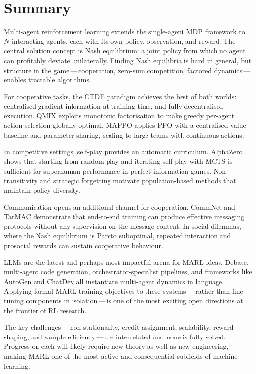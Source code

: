 \section{Summary}
\label{sec:marl-summary}

Multi-agent reinforcement learning extends the single-agent MDP
framework to $N$ interacting agents, each with its own policy,
observation, and reward. The central solution concept is Nash
equilibrium: a joint policy from which no agent can profitably
deviate unilaterally. Finding Nash equilibria is hard in general,
but structure in the game\,---\,cooperation, zero-sum competition,
factored dynamics\,---\,enables tractable algorithms.

For cooperative tasks, the CTDE paradigm achieves the best of
both worlds: centralised gradient information at training time,
and fully decentralised execution. QMIX exploits monotonic
factorisation to make greedy per-agent action selection globally
optimal. MAPPO applies PPO with a centralised value baseline and
parameter sharing, scaling to large teams with continuous actions.

In competitive settings, self-play provides an automatic curriculum.
AlphaZero shows that starting from random play and iterating
self-play with MCTS is sufficient for superhuman performance in
perfect-information games. Non-transitivity and strategic forgetting
motivate population-based methods that maintain policy diversity.

Communication opens an additional channel for cooperation.
CommNet and TarMAC demonstrate that end-to-end training can
produce effective messaging protocols without any supervision
on the message content. In social dilemmas, where the Nash
equilibrium is Pareto suboptimal, repeated interaction and
prosocial rewards can sustain cooperative behaviour.

LLMs are the latest and perhaps most impactful arena for MARL
ideas. Debate, multi-agent code generation, orchestrator-specialist
pipelines, and frameworks like AutoGen and ChatDev all instantiate
multi-agent dynamics in language. Applying formal MARL training
objectives to these systems\,---\,rather than fine-tuning components
in isolation\,---\,is one of the most exciting open directions at
the frontier of RL research.

The key challenges\,---\,non-stationarity, credit assignment,
scalability, reward shaping, and sample efficiency\,---\,are
interrelated and none is fully solved. Progress on each will likely
require new theory as well as new engineering, making MARL one of
the most active and consequential subfields of machine learning.

